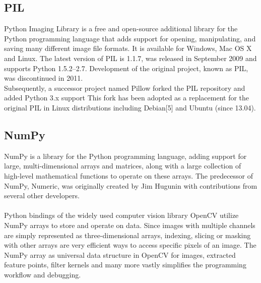\subsection{\textbf{PIL}}
\cite{PIL}
Python Imaging Library is a free and open-source additional library for the Python programming language that adds support for opening, manipulating, and saving many different image file formats. It is available for Windows, Mac OS X and Linux. The latest version of PIL is 1.1.7, was released in September 2009 and supports Python 1.5.2–2.7. Development of the original project, known as PIL, was discontinued in 2011.\\
Subsequently, a successor project named Pillow forked the PIL repository and added Python 3.x support This fork has been adopted as a replacement for the original PIL in Linux distributions including Debian[5] and Ubuntu (since 13.04).\\
\subsection{\textbf{NumPy}}
\cite{NumPy}
NumPy is a library for the Python programming language, adding support for large, multi-dimensional arrays and matrices, along with a large collection of high-level mathematical functions to operate on these arrays. The predecessor of NumPy, Numeric, was originally created by Jim Hugunin with contributions from several other developers.\\

\\Python bindings of the widely used computer vision library OpenCV utilize NumPy arrays to store and operate on data. Since images with multiple channels are simply represented as three-dimensional arrays, indexing, slicing or masking with other arrays are very efficient ways to access specific pixels of an image. The NumPy array as universal data structure in OpenCV for images, extracted feature points, filter kernels and many more vastly simplifies the programming workflow and debugging.\\



